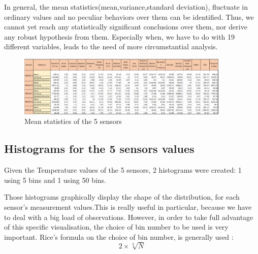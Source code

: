 \documentclass[a4paper,12pt]{article} %
\begin{document}
\setlength{\parindent}{8ex} In general, the mean statistics(mean,variance,standard deviation), fluctuate in ordinary values and no peculiar behaviors over them can be identified. Thus, we cannot yet reach any statistically significant conclusions over them, nor derive any robust hypothesis from them. Especially when, we have to do with 19 different variables, leads to the need of more circumstantial analysis. 
\vspace{10mm}
 \begin{figure}[H]   
	\centering 
	\includegraphics[width=0.9\textwidth]{Mean_Statistics.png}
	\caption{Mean statistics of the 5 sensors} 
\end{figure}
\vspace{10mm}
\subsection{Histograms for the 5 sensors values}
\vspace{5mm}
Given the Temperature values of the 5 sensors, 2 histograms were created: 1 using 5 bins and 1 using 50 bins.

\setlength{\parindent}{8ex}Those histograms graphically display the shape of the distribution, for each sensor's measurement values.This is really useful in particular, because we have to deal with a big load of observations. However, in order to take  full advantage of this specific visualisation, the choice of bin number to be used is very important. Rice's formula on the choice of bin number, is generally used : \[2\times\sqrt[3]{N}\]
\end{document}
